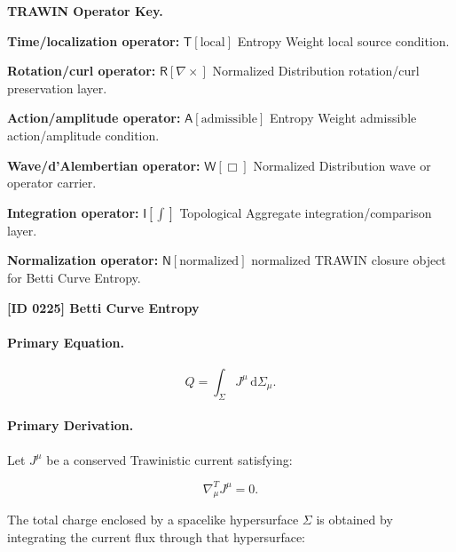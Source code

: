 \par\vspace{0.45\baselineskip}
\noindent\begin{minipage}[t]{\linewidth}
\begingroup
\small
\raggedright
\textbf{TRAWIN Operator Key.}\par
\noindent\textbf{Time/localization operator:} $\mathsf{T}\!\left[\mathrm{local}\right]$ Entropy Weight local source condition.\par
\noindent\textbf{Rotation/curl operator:} $\mathsf{R}\!\left[\nabla\times\right]$ Normalized Distribution rotation/curl preservation layer.\par
\noindent\textbf{Action/amplitude operator:} $\mathsf{A}\!\left[\mathrm{admissible}\right]$ Entropy Weight admissible action/amplitude condition.\par
\noindent\textbf{Wave/d'Alembertian operator:} $\mathsf{W}\!\left[\Box\right]$ Normalized Distribution wave or operator carrier.\par
\noindent\textbf{Integration operator:} $\mathsf{I}\!\left[\int\right]$ Topological Aggregate integration/comparison layer.\par
\noindent\textbf{Normalization operator:} $\mathsf{N}\!\left[\mathrm{normalized}\right]$ normalized TRAWIN closure object for Betti Curve Entropy.\par
\endgroup
\end{minipage}

\clearpage
\noindent\textbf{[ID 0225] Betti Curve Entropy}\par
\vspace{0.35em}
\paragraph{Primary Equation.}
\begin{equation}
Q
=
\int_{\Sigma}
J^\mu
\,\mathrm{d}\Sigma_\mu .
\end{equation}

\paragraph{Primary Derivation.}
Let $J^\mu$ be a conserved Trawinistic current satisfying:

\begin{equation}
\nabla^T_\mu J^\mu = 0 .
\end{equation}

The total charge enclosed by a spacelike hypersurface $\Sigma$ is obtained by integrating the current flux through that hypersurface:

